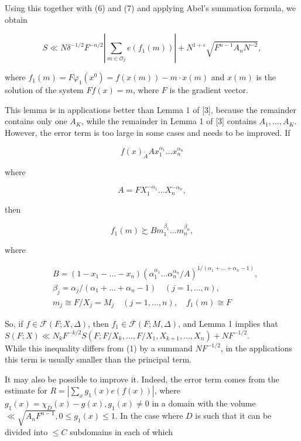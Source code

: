 \documentclass[10pt]{article}
\begin{document}
Using this together with (6) and (7) and applying Abel's summation formula, we obtain

$$
S \ll N \delta^{-1 / 2} F^{-n / 2}\left|\sum_{m \in \mathscr{O}_{2}} e\left(f_{1}(m)\right)\right|+N^{1+\varepsilon} \sqrt{F^{n-1} A_{n} N^{-2}},
$$

where $f_{1}(m)=F \varphi_{1}\left(x^{0}\right)=f(x(m))-m \cdot x(m)$ and $x(m)$ is the solution of the system $F f(x)=m$, where $F$ is the gradient vector.

This lemma is in applications better than Lemma 1 of [3], because the remainder contains only one $A_{K}$, while the remainder in Lemma 1 of [3] contains $A_{1}, \ldots, A_{K}$. However, the error term is too large in some cases and needs to be improved. If

$$
f(x)_{\widetilde{A}} A x_{1}^{\alpha_{1}} \ldots x_{n}^{\alpha_{n}}
$$

where

$$
A=F X_{1}^{-\alpha_{1}} \ldots X_{n}^{-\alpha_{n}},
$$

then

$$
f_{1}(m) \succsim B m_{1}^{\beta_{1}} \ldots m_{n}^{\beta_{n}},
$$

where

$$
\begin{aligned}
& B=\left(1-x_{1}-\ldots-x_{n}\right)\left(\alpha_{1}^{\alpha_{1}} \ldots \alpha_{n}^{\alpha_{n}} / A\right)^{1 /\left(\alpha_{1}+\ldots+\alpha_{n}-1\right)}, \\
& \beta_{j}=\alpha_{j} /\left(\alpha_{1}+\ldots+\alpha_{n}-1\right) \quad(j=1, \ldots, n), \\
& m_{j} \cong F / X_{j}=M_{j} \quad(j=1, \ldots, n), \quad f_{1}(m) \cong F
\end{aligned}
$$

So, if $f \in \mathscr{F}(F ; X, \Delta)$, then $f_{1} \in \mathscr{F}(F ; M, \Delta)$, and Lemma 1 implies that $S(F ; X) \ll N_{k} F^{-k / 2} S\left(F ; F / X_{k}, \ldots, F / X_{1}, X_{k+1}, \ldots, X_{n}\right)+N F^{-1 / 2}$.\\
While this inequality differs from (1) by a summand $N F^{-1 / 2}$, in the applications this term is usually smaller than the principal term.

It may also be possible to improve it. Indeed, the error term comes from the estimate for $R=\left|\sum_{x} g_{1}(x) e(f(x))\right|$, where $g_{1}(x)=\chi_{D}(x)-g(x), g_{1}(x) \neq 0$ in a domain with the volume $\ll \sqrt{A_{n} F^{n-1}}, 0 \leqslant g_{1}(x) \leqslant 1$. In the case where $D$ is such that it can be divided into $\leqslant C$ subdomains in each of which
\end{document}

